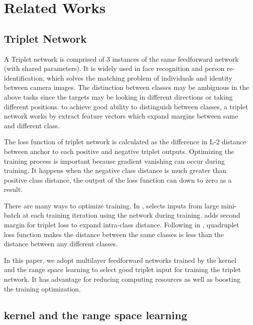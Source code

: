 \documentclass[runningheads]{llncs}
\begin{document}
\section{Related Works}

\subsection{Triplet Network}
A Triplet network is comprised of 3 instances of the same feedforward network (with shared parameters)\cite{hoffer2015deep}. It is widely used in face recognition \cite{schroff2015facenet} and person re-identification, which solves the matching problem of individuals and identity between camera images\cite{cheng2016person,chen2017beyond}.
The distinction between classes may be ambiguous in the above tasks since the targets may be looking in different directions or taking different positions.
to achieve good ability to distinguish between classes, a triplet network works by extract feature vectors which expand margins between same and different class. 

The loss function of triplet network is calculated as the difference in L-2 distance between anchor to each positive and negative triplet outputs.
Optimizing the training process is important because gradient vanishing can occur during training.
It happens when the negative class distance is much greater than positive class distance, the output of the loss function can down to zero as a result.

There are many ways to optimize training. In \cite{schroff2015facenet}, selects inputs from large mini-batch at each training iteration using the network during training. \cite{cheng2016person} adds second margin for triplet loss to expand intra-class distance.
Following in \cite{chen2017beyond}, quadruplet loss function makes the distance between the same classes is less than the distance between any different classes. 

In this paper, we adopt multilayer feedforward networks trained by the kernel and the range space learning to select good triplet input for training the triplet network. It has advantage for reducing computing resources as well as boosting the training optimization.
\subsection{kernel and the range space learning}
\end{document}
